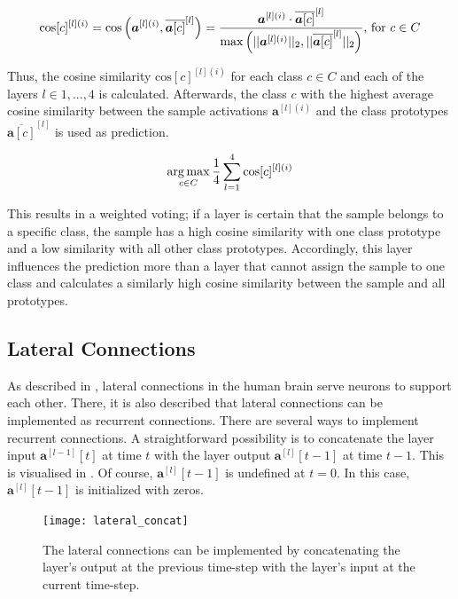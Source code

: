 \begin{align}\eqlbl{vso_11}
		\text{cos}[c]^{[l](i)} = \text{cos} \left( \boldsymbol{a}^{[l](i)}, \overline{\boldsymbol{a}[c]}^{[l]} \right) = \frac{\boldsymbol{a}^{[l](i)} \cdot \overline{\boldsymbol{a}[c]}^{[l]}}{\max \left( ||\boldsymbol{a}^{[l](i)}||_2, ||\overline{\boldsymbol{a}[c]}^{[l]}||_2 \right)} \text{, for } c \in C
\end{align}

Thus, the cosine similarity $\text{cos}[c]^{[l](i)}$ for each class $c \in C$ and each of the layers $l \in {1, ..., 4}$ is calculated. Afterwards, the class $c$ with the highest average cosine similarity between the sample activations $\boldsymbol{a}^{[l](i)}$ and the class prototypes $\overline{\boldsymbol{a}[c]}^{[l]} 
$ is used as prediction.

\begin{align}\eqlbl{vso_12}
		\argmax_{c \in C} \frac{1}{4} \sum_{l=1}^{4} \text{cos}[c]^{[l](i)}
\end{align}

This results in a weighted voting; if a layer is certain that the sample belongs to a specific class, the sample has a high cosine similarity with one class prototype and a low similarity with all other class prototypes. Accordingly, this layer influences the prediction more than a layer that cannot assign the sample to one class and calculates a similarly high cosine similarity between the sample and all prototypes.

\subsection{Lateral Connections}
As described in , lateral connections in the human brain serve neurons to support each other.
There, it is also described that lateral connections can be implemented as recurrent connections.
There are several ways to implement recurrent connections. A straightforward possibility is to concatenate the layer input $\boldsymbol{a}^{[l-1]}[t]$ at time $t$ with the layer output $\boldsymbol{a}^{[l]}[t-1]$  at time $t-1$. This is visualised in . Of course, $\boldsymbol{a}^{[l]}[t-1]$ is undefined at $t=0$. In this case, $\boldsymbol{a}^{[l]}[t-1]$ is initialized with zeros.

\begin{figure}[h]
    \centering
    \texttt{[image: lateral\_concat]}
    \caption[Lateral connections by concatenating the layer's output with the layer's input]{The lateral connections can be implemented by concatenating the layer's output at the previous time-step with the layer's input at the current time-step.}
\end{figure}



